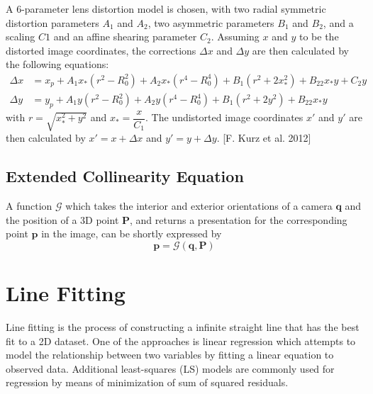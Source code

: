 A 6-parameter lens distortion model is chosen, with two radial symmetric distortion parameters $A_1$ and $A_2$, two asymmetric parameters $B_1$ and $B_2$, and a scaling $C1$ and an affine shearing parameter $C_2$. Assuming $x$ and $y$ to be the distorted image coordinates, the corrections $\Delta x$ and $\Delta y$ are then calculated by the following equations:
\begin{equation} \label{eq:LensDistortion}
\begin{split}
\Delta x &= x_p + A_1x_*(r^2-R_0^2) + A_2x_*(r^4-R_0^4) + B_1(r^2+2x_*^2) + B_22x_*y+C_2y \\
\Delta y &= y_p + A_1y  (r^2-R_0^2) + A_2y  (r^4-R_0^4) + B_1(r^2+2y^2)   + B_22x_*y
\end{split}
\end{equation}
with $r=\sqrt{x_*^2+y^2}$ and $x_*=\dfrac{x}{C_1}$. The undistorted image coordinates $x\prime$ and $y\prime$ are then calculated by $x\prime=x+\Delta x$ and $y\prime=y+\Delta y$. [F. Kurz et al. 2012] 

\subsection{Extended Collinearity Equation}
\label{subsec:ExtendedCollinearity}

A function $\mathcal{G}$ which takes the interior and exterior orientations of a camera $\mathbf{q}$ and the position of a 3D point $\mathbf{P}$, and returns a presentation for the corresponding point $\mathbf{p}$ in the image, can be shortly expressed by
\begin{equation} \label{eq:Gfunction}
\mathbf{p} = \mathcal{G}(\mathbf{q},\mathbf{P}) 
\end{equation}

\section{Line Fitting}
\label{sec:LineFitting}

Line fitting is the process of constructing a infinite straight line that has the best fit to a 2D dataset. One of the approaches is linear regression which attempts to model the relationship between two variables by fitting a linear equation to observed data. %
Additional least-squares (LS) models are commonly used for regression by means of minimization of sum of squared residuals.

